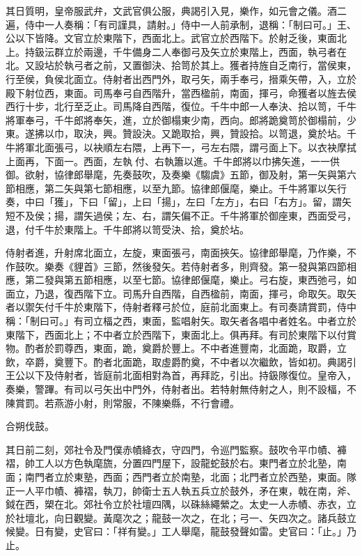 \begin{pinyinscope}
 其日質明，皇帝服武弁，文武官俱公服，典謁引入見，樂作，如元會之儀。酒二遍，侍中一人奏稱：「有司謹具，請射。」侍中一人前承制，退稱：「制曰可。」王、公以下皆降。文官立於東階下，西面北上。武官立於西階下。於射乏後，東面北上。持鈒沄群立於兩邊，千牛備身二人奉御弓及矢立於東階上，西面，執弓者在北。又設坫於執弓者之前，又置御決、拾笥於其上。獲者持旌自乏南行，當侯東，行至侯，負侯北面立。侍射者出西門外，取弓矢，兩手奉弓，搢乘矢帶，入，立於殿下射位西，東面。司馬奉弓自西階升，當西楹前，南面，揮弓，命獲者以旌去侯西行十步，北行至乏止。司馬降自西階，復位。千牛中郎一人奉決、拾以笥，千牛將軍奉弓，千牛郎將奉矢，進，立於御榻東少南，西向。郎將跪奠笥於御榻前，少東。遂拂以巾，取決，興。贊設決。又跪取拾，興，贊設拾。以笥退，奠於坫。千牛將軍北面張弓，以袂順左右隈，上再下一，弓左右隈，謂弓面上下。以衣袂摩拭上面再，下面一。西面，左執付、右執簫以進。千牛郎將以巾拂矢進，一一供御。欲射，協律郎舉麾，先奏鼓吹，及奏樂《騶虞》五節，御及射，第一矢與第六節相應，第二矢與第七節相應，以至九節。協律郎偃麾，樂止。千牛將軍以矢行奏，中曰「獲」，下曰「留」，上曰「揚」，左曰「左方」，右曰「右方」。留，謂矢短不及侯；揚，謂矢過侯；左、右，謂矢偏不正。千牛將軍於御座東，西面受弓，退，付千牛於東階上。千牛郎將以笥受決、拾，奠於坫。



 侍射者進，升射席北面立，左旋，東面張弓，南面挾矢。協律郎舉麾，乃作樂，不作鼓吹。樂奏《貍首》三節，然後發矢。若侍射者多，則齊發。第一發與第四節相應，第二發與第五節相應，以至七節。協律郎偃麾，樂止。弓右旋，東西弛弓，如面立，乃退，復西階下立。司馬升自西階，自西楹前，南面，揮弓，命取矢。取矢者以禦矢付千牛於東階下，侍射者釋弓於位，庭前北面東上。有司奏請賞罰，侍中稱：「制曰可。」有司立楅之西，東面，監唱射矢。取矢者各唱中者姓名。中者立於東階下，西面北上；不中者立於西階下，東面北上。俱再拜。有司於東階下以付賞物。酌者於罰尊西，東面，跪，奠爵於豐上。不中者進豐南，北面跪，取爵，立飲，卒爵，奠豐下。酌者北面跪，取虛爵酌奠，不中者以次繼飲，皆如初。典謁引王公以下及侍射者，皆庭前北面相對為首，再拜訖，引出。持鈒隊復位。皇帝入，奏樂，警蹕。有司以弓矢出中門外，侍射者出。若特射無侍射之人，則不設楅，不陳賞罰。若燕游小射，則常服，不陳樂縣，不行會禮。



 合朔伐鼓。



 其日前二刻，郊社令及門僕赤幘絳衣，守四門，令巡門監察。鼓吹令平巾幘、褲褶，帥工人以方色執麾旒，分置四門屋下，設龍蛇鼓於右。東門者立於北塾，南面；南門者立於東塾，西面；西門者立於南塾，北面；北門者立於西塾，東面。隊正一人平巾幘、褲褶，執刀，帥衛士五人執五兵立於鼓外，矛在東，戟在南，斧、鉞在西，槊在北。郊社令立於社壇四隅，以硃絲繩縈之。太史一人赤幘、赤衣，立於社壇北，向日觀變。黃麾次之；龍鼓一次之，在北；弓一、矢四次之。諸兵鼓立候變。日有變，史官曰：「祥有變。」工人舉麾，龍鼓發聲如雷。史官曰：「止。」乃止。




\end{pinyinscope}
